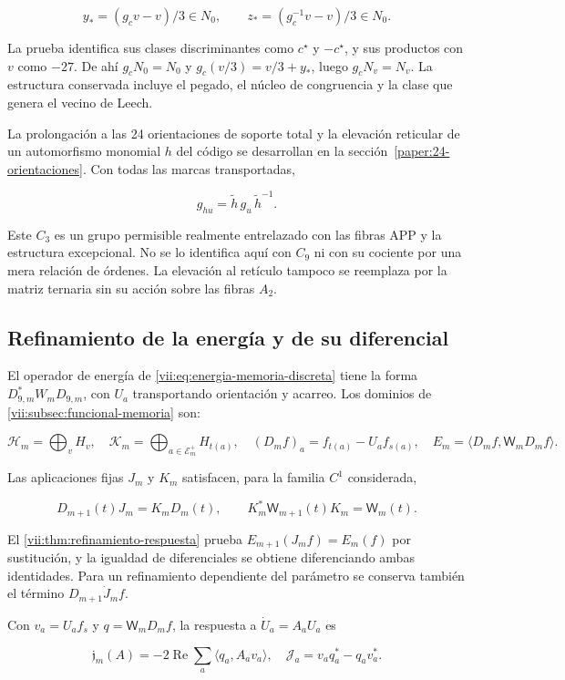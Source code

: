 \[
y_*=(g_cv-v)/3\in N_0,\qquad
z_*=(g_c^{-1}v-v)/3\in N_0.
\]

La prueba identifica sus clases discriminantes como \(c^\star\) y \(-c^\star\), y sus productos con \(v\) como \(-27\). De ahí \(g_cN_0=N_0\) y \(g_c(v/3)=v/3+y_*\), luego \(g_cN_v=N_v\). La estructura conservada incluye el pegado, el núcleo de congruencia y la clase que genera el vecino de Leech.

La prolongación a las 24 orientaciones de soporte total y la elevación reticular de un automorfismo monomial \(h\) del código se desarrollan en la sección~\ref{paper:24-orientaciones}. Con todas las marcas transportadas,

\[
g_{hu}=\widetilde h\,g_u\,\widetilde h^{-1}.
\]

Este \(C_3\) es un grupo permisible realmente entrelazado con las fibras APP y la estructura excepcional. No se lo identifica aquí con \(C_9\) ni con su cociente por una mera relación de órdenes. La elevación al retículo tampoco se reemplaza por la matriz ternaria sin su acción sobre las fibras \(A_2\).

\subsection{Refinamiento de la energía y de su diferencial}
\label{paper:refinamiento-energia}

El operador de energía de \eqref{vii:eq:energia-memoria-discreta} tiene la forma \(D_{9,m}^*W_mD_{9,m}\), con \(U_a\) transportando orientación y acarreo. Los dominios de \cref{vii:subsec:funcional-memoria} son:

\[
\mathcal H_m=\bigoplus_vH_v,\quad
\mathcal K_m=\bigoplus_{a\in\mathcal E_m^+}H_{t(a)},\quad
(D_mf)_a=f_{t(a)}-U_af_{s(a)},\quad
E_m=\langle D_mf,\mathsf W_mD_mf\rangle.
\]

Las aplicaciones fijas \(J_m\) y \(K_m\) satisfacen, para la familia \(C^1\) considerada,

\[
D_{m+1}(t)J_m=K_mD_m(t),\qquad
K_m^*\mathsf W_{m+1}(t)K_m=\mathsf W_m(t).
\]

El \cref{vii:thm:refinamiento-respuesta} prueba \(E_{m+1}(J_mf)=E_m(f)\) por sustitución, y la igualdad de diferenciales se obtiene diferenciando ambas identidades. Para un refinamiento dependiente del parámetro se conserva también el término \(D_{m+1}\dot J_mf\).

Con \(v_a=U_af_s\) y \(q=\mathsf W_mD_mf\), la respuesta a \(\dot U_a=A_aU_a\) es

\[
\mathfrak j_m(A)=-2\operatorname{Re}\sum_a\langle q_a,A_av_a\rangle,
\quad \mathcal J_a=v_aq_a^*-q_av_a^*.
\]

